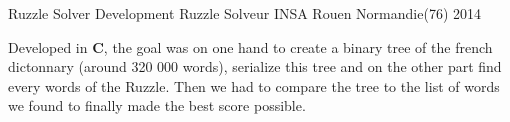 \begin{cventries}
  \cventry
	{Ruzzle Solver Development} %
	{Ruzzle Solveur} %
	{INSA Rouen Normandie(76)} %
	{2014} %
	{
		\begin{cvitems} %
			\item {Developed in \textbf{C}, the goal was on one hand to create a binary tree of the french dictonnary (around 320 000 words), serialize this tree and on the other part find every words of the Ruzzle. Then we had to compare the tree to the list of words we found to finally made the best score possible.}
		\end{cvitems}
	}

\end{cventries}
